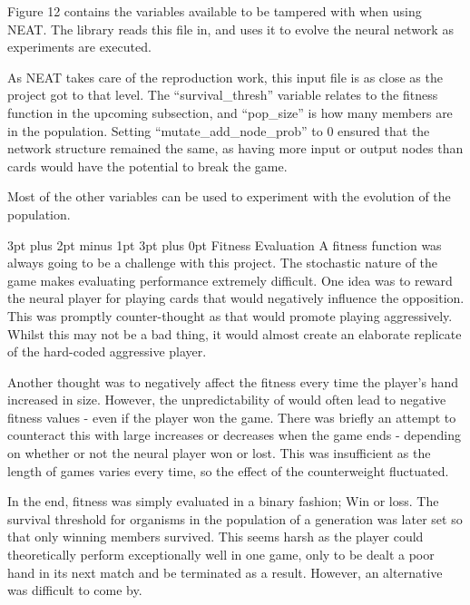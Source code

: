 \documentclass[12pt,a4paper]{article}
\makeatletter
\renewcommand\subsection{\@startsection {subsection}{1}{2mm} %
                               {3pt plus 2pt minus 1pt} %
                               {3pt plus 0pt} %
                               {\normalfont\bfseries}}
\makeatother
\begin{document}
Figure 12 contains the variables available to be tampered with when using NEAT. The library reads this file in, and uses it to evolve the neural network as experiments are executed. 

As NEAT takes care of the reproduction work, this input file is as close as the project got to that level. The \enquote{survival\_thresh} variable relates to the fitness function in the upcoming subsection, and \enquote{pop\_size} is how many members are in the population. Setting \enquote{mutate\_add\_node\_prob} to 0 ensured that the network structure remained the same, as having more input or output nodes than cards would have the potential to break the game. 

Most of the other variables can be used to experiment with the evolution of the population. 


\newpage
\subsection{Fitness Evaluation}
A fitness function was always going to be a challenge with this project. The stochastic nature of the game makes evaluating performance extremely difficult. One idea was to reward the neural player for playing cards that would negatively influence the opposition. This was promptly counter-thought as that would promote playing aggressively. Whilst this may not be a bad thing, it would almost create an elaborate replicate of the hard-coded aggressive player. 

Another thought was to negatively affect the fitness every time the player's hand increased in size. However, the unpredictability of would often lead to negative fitness values - even if the player won the game. There was briefly an attempt to counteract this with large increases or decreases when the game ends - depending on whether or not the neural player won or lost. This was insufficient as the length of games varies every time, so the effect of the counterweight fluctuated.

In the end, fitness was simply evaluated in a binary fashion; Win or loss. The survival threshold for organisms in the population of a generation was later set so that only winning members survived. This seems harsh as the player could theoretically perform exceptionally well in one game, only to be dealt a poor hand in its next match and be terminated as a result. However, an alternative was difficult to come by.
\end{document}
